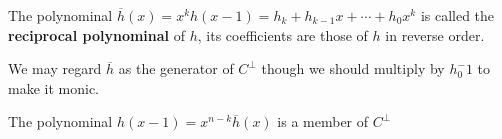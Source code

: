 \documentclass{article}
\begin{document}
\begin{definition}
  The polynominal \( \overline{h}(x) = x^kh(x-1) = h_k + h_{k-1}x + \cdots + h_0x^k    \) is called the \textbf{reciprocal polynominal} of \( h \), its coefficients are those of \( h   \) in reverse order.

  We may regard \( \overline{h}  \) as the generator of \( C^\perp  \) though we should multiply by \( h_0^-1 \) to make it monic.
\end{definition}
\begin{remark}
  The polynominal \( h(x-1) =x^{n-k}\overline{h}(x) \) is a member of \( C^\perp  \)
\end{remark}
\end{document}
